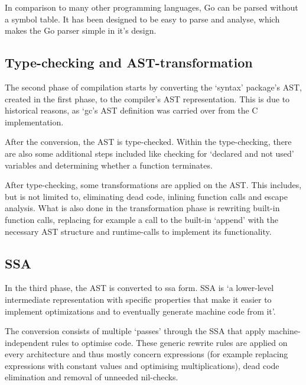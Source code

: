 In comparison to many other programming languages, Go can be parsed without a
symbol table. It has been designed to be easy to parse
and analyse, which makes the Go parser simple in it's design\autocite{go-faq-symbol}.

\subsection{Type-checking and AST-transformation}\label{sec:comp-type}

The second phase of compilation starts by converting the `syntax' package's
AST, created in the first phase, to the compiler's AST representation. This
is due to historical reasons, as `gc's AST definition was carried over
from the C implementation.

After the conversion, the AST is type-checked. Within the type-checking, there
are also some additional steps included like checking for `declared and not used'
variables and determining whether a function terminates.

After type-checking, some transformations are applied on the AST. This includes,
but is not limited to, eliminating dead code, inlining function calls and escape
analysis. What is also done in the transformation phase is rewriting built-in function
calls, replacing for example a call to the built-in `append' with the necessary
AST structure and runtime-calls to implement its functionality.

\subsection{SSA}

In the third phase, the AST is converted to \gls{ssa} form. SSA  is `a
lower-level intermediate representation with specific properties that make it
easier to implement optimizations and to eventually generate machine code from
it'\autocite{compiler-readme}.

The conversion consists of multiple `passes' through the SSA that
apply machine-independent rules to optimise code. These generic
rewrite rules are applied on every architecture and thus mostly
concern expressions (for example replacing expressions with constant values and
optimising multiplications), dead code elimination and removal of unneeded
nil-checks.

